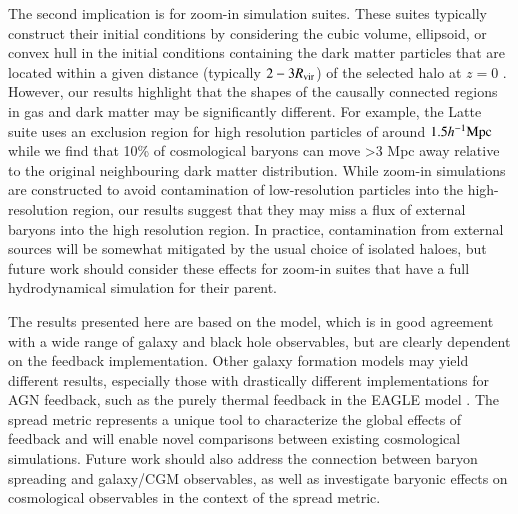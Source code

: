 The second implication is for zoom-in simulation suites. These suites
typically construct their initial conditions by considering the cubic volume,
ellipsoid, or convex hull in the initial conditions containing the dark
matter particles that are located within a given distance (typically
$2-3R_{\rm vir}$) of the selected halo at $z=0$ \citep[see e.g.][]{Onorbe2014}.
However, our results highlight that the shapes of the
causally connected regions in gas and dark matter may be significantly
different. For example, the Latte \citep{Wetzel2016} suite uses an exclusion
region for high resolution particles of around $1.5 h^{-1}{\rm Mpc}{}$ while we find
that 10\% of cosmological baryons can move >3 Mpc away relative to the
original neighbouring dark matter distribution. While zoom-in simulations are
constructed to avoid contamination of low-resolution particles into the
high-resolution region, our results suggest that they may miss a flux of
external baryons into the high resolution region. In practice, contamination
from external sources will be somewhat mitigated by the usual choice of
isolated haloes, but future work should consider these effects for zoom-in
suites that have a full hydrodynamical simulation for their parent.


The results presented here are based on the \simba{} model, which is in good
agreement with a wide range of galaxy \citep{Dave2019} and black hole
\citep{Thomas2019} observables, but are clearly dependent on the feedback
implementation. Other galaxy formation models may yield different results,
especially those with drastically different implementations for AGN feedback,
such as the purely thermal feedback in the EAGLE model
\citep{Schaye2015}. The spread metric represents a unique tool to
characterize the global effects of feedback and will enable novel comparisons
between existing cosmological simulations. Future work should also address
the connection between baryon spreading and galaxy/CGM observables, as well
as investigate baryonic effects on cosmological observables
\citep{Schneider2015, Chisari2018} in the context of the spread metric.

